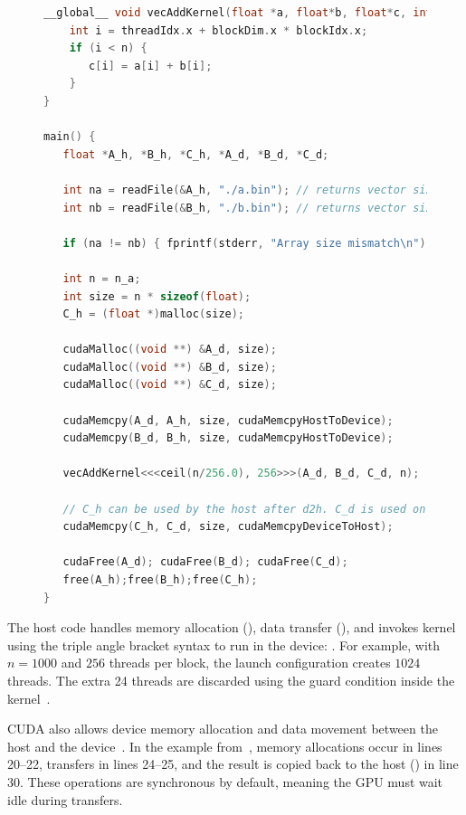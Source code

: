 \documentclass[Ingles,Final]{ic-tese-v3}
\begin{document}
\begin{figure}[h]
\centering
\begin{lstlisting}[language=C++, caption={CUDA kernel and host code for element-wise vector addition. This is an adapted version from the example given in Hwu, Wen-Mei W~\etal(2022)\cite{kirk}}, label={lst:cudaexample}]
__global__ void vecAddKernel(float *a, float*b, float*c, int n) {
    int i = threadIdx.x + blockDim.x * blockIdx.x;
    if (i < n) {
       c[i] = a[i] + b[i];
    }
}

main() {
   float *A_h, *B_h, *C_h, *A_d, *B_d, *C_d;

   int na = readFile(&A_h, "./a.bin"); // returns vector size
   int nb = readFile(&B_h, "./b.bin"); // returns vector size

   if (na != nb) { fprintf(stderr, "Array size mismatch\n"); return 1;}

   int n = n_a;
   int size = n * sizeof(float);
   C_h = (float *)malloc(size);
 
   cudaMalloc((void **) &A_d, size);
   cudaMalloc((void **) &B_d, size);
   cudaMalloc((void **) &C_d, size);

   cudaMemcpy(A_d, A_h, size, cudaMemcpyHostToDevice);
   cudaMemcpy(B_d, B_h, size, cudaMemcpyHostToDevice);

   vecAddKernel<<<ceil(n/256.0), 256>>>(A_d, B_d, C_d, n);

   // C_h can be used by the host after d2h. C_d is used only in GPU.
   cudaMemcpy(C_h, C_d, size, cudaMemcpyDeviceToHost);

   cudaFree(A_d); cudaFree(B_d); cudaFree(C_d);
   free(A_h);free(B_h);free(C_h);
}
\end{lstlisting}
\end{figure}

The host code handles memory allocation (), data transfer (), and invokes kernel using the triple angle bracket syntax to run in the device: . For example, with $n = 1000$ and $256$ threads per block, the launch configuration  creates $1024$ threads. The extra 24 threads are discarded using the guard condition  inside the kernel~\cite{kirk}.

CUDA also allows device memory allocation and data movement between the host and the device~\cite{cuda}. In the example from~, memory allocations occur in lines 20–22, \htd transfers in lines 24–25, and the result is copied back to the host (\dth) in line 30. These operations are synchronous by default, meaning the GPU must wait idle during transfers.
\end{document}
